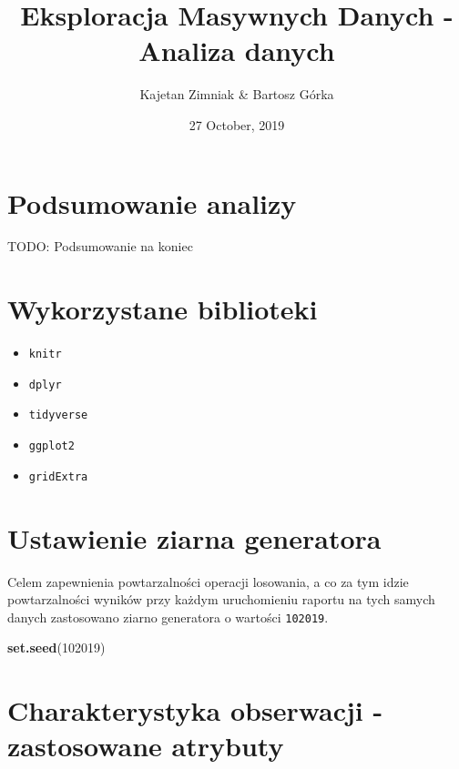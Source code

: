 \documentclass[]{article}
\title{Eksploracja Masywnych Danych - Analiza danych}
\author{Kajetan Zimniak \& Bartosz Górka}
\date{27 October, 2019}
\newenvironment{Shaded}{\begin{snugshade}}{\end{snugshade}}
\newcommand{\DecValTok}[1]{\textcolor[rgb]{0.00,0.00,0.81}{#1}}
\newcommand{\KeywordTok}[1]{\textcolor[rgb]{0.13,0.29,0.53}{\textbf{#1}}}
\newcommand{\NormalTok}[1]{#1}
\providecommand{\tightlist}{%
  \setlength{\itemsep}{0pt}\setlength{\parskip}{0pt}}
\begin{document}
\maketitle

{
\setcounter{tocdepth}{2}
\tableofcontents
}
\hypertarget{podsumowanie-analizy}{%
\section{Podsumowanie analizy}\label{podsumowanie-analizy}}

TODO: Podsumowanie na koniec

\hypertarget{wykorzystane-biblioteki}{%
\section{Wykorzystane biblioteki}\label{wykorzystane-biblioteki}}

\begin{itemize}
\tightlist
\item
  \texttt{knitr}
\item
  \texttt{dplyr}
\item
  \texttt{tidyverse}
\item
  \texttt{ggplot2}
\item
  \texttt{gridExtra}
\end{itemize}

\hypertarget{ustawienie-ziarna-generatora}{%
\section{Ustawienie ziarna
generatora}\label{ustawienie-ziarna-generatora}}

Celem zapewnienia powtarzalności operacji losowania, a co za tym idzie
powtarzalności wyników przy każdym uruchomieniu raportu na tych samych
danych zastosowano ziarno generatora o wartości \texttt{102019}.

\begin{Shaded}
\begin{Highlighting}[]
\KeywordTok{set.seed}\NormalTok{(}\DecValTok{102019}\NormalTok{)}
\end{Highlighting}
\end{Shaded}

\hypertarget{charakterystyka-obserwacji---zastosowane-atrybuty}{%
\section{Charakterystyka obserwacji - zastosowane
atrybuty}\label{charakterystyka-obserwacji---zastosowane-atrybuty}}
\end{document}
